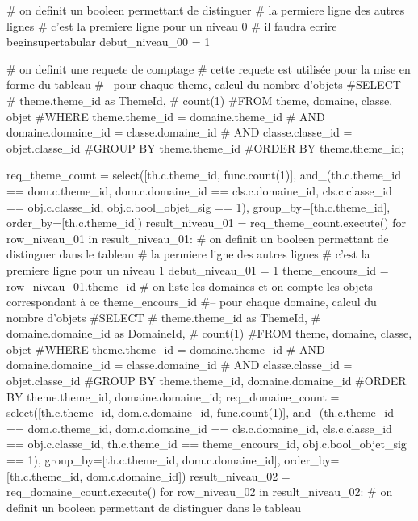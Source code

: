 \documentclass[12pt,titlepage,oneside]{book}
\begin{document}
\begin{lbdpython}

# on definit un booleen permettant de distinguer
# la permiere ligne des autres lignes
# c'est la premiere ligne pour un niveau 0
# il faudra ecrire begin{supertabular}
debut_niveau_00 = 1


# on definit une requete de comptage
# cette requete est utilisée pour la mise en forme du tableau
#-- pour chaque theme, calcul du nombre d'objets
#SELECT
#   theme.theme_id as ThemeId,
#   count(1)
#FROM theme, domaine, classe, objet
#WHERE theme.theme_id = domaine.theme_id 
#  AND domaine.domaine_id = classe.domaine_id
#  AND classe.classe_id = objet.classe_id
#GROUP BY theme.theme_id
#ORDER BY theme.theme_id;

req_theme_count = select([th.c.theme_id, func.count(1)],
                  and_(th.c.theme_id == dom.c.theme_id,
                       dom.c.domaine_id == cls.c.domaine_id,
                       cls.c.classe_id == obj.c.classe_id,
                       obj.c.bool_objet_sig == 1),
                  group_by=[th.c.theme_id],
                  order_by=[th.c.theme_id])
result_niveau_01 = req_theme_count.execute()
for row_niveau_01 in result_niveau_01:
   # on definit un booleen permettant de distinguer dans le tableau
   # la permiere ligne des autres lignes
   # c'est la premiere ligne pour un niveau 1
   debut_niveau_01 = 1
   theme_encours_id = row_niveau_01.theme_id
   # on liste les domaines et on compte les objets correspondant à ce theme_encours_id
   #-- pour chaque domaine, calcul du nombre d'objets
   #SELECT
   #   theme.theme_id as ThemeId,
   #   domaine.domaine_id as DomaineId,
   #   count(1)
   #FROM theme, domaine, classe, objet
   #WHERE theme.theme_id = domaine.theme_id
   #  AND domaine.domaine_id = classe.domaine_id
   #  AND classe.classe_id = objet.classe_id
   #GROUP BY theme.theme_id, domaine.domaine_id
   #ORDER BY theme.theme_id, domaine.domaine_id;
   req_domaine_count = select([th.c.theme_id, dom.c.domaine_id, func.count(1)],
                       and_(th.c.theme_id == dom.c.theme_id,
                            dom.c.domaine_id == cls.c.domaine_id,
                            cls.c.classe_id == obj.c.classe_id,
                            th.c.theme_id == theme_encours_id,
                            obj.c.bool_objet_sig == 1),
                       group_by=[th.c.theme_id, dom.c.domaine_id],
                       order_by=[th.c.theme_id, dom.c.domaine_id])
   result_niveau_02 = req_domaine_count.execute()
   for row_niveau_02 in result_niveau_02:
      # on definit un booleen permettant de distinguer dans le tableau

\end{lbdpython}
\end{document}
